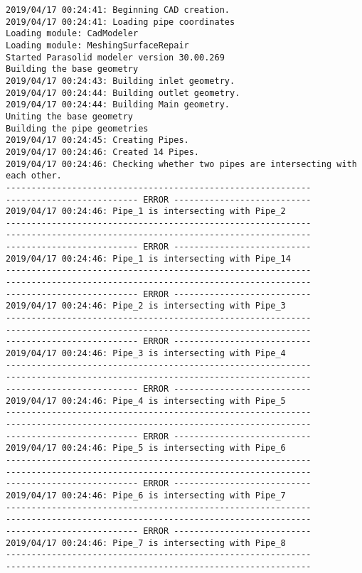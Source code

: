 \documentclass{article}
\begin{document}
{\tiny 
\begin{verbatim}
2019/04/17 00:24:41: Beginning CAD creation.
2019/04/17 00:24:41: Loading pipe coordinates
Loading module: CadModeler
Loading module: MeshingSurfaceRepair
Started Parasolid modeler version 30.00.269
Building the base geometry
2019/04/17 00:24:43: Building inlet geometry.
2019/04/17 00:24:44: Building outlet geometry.
2019/04/17 00:24:44: Building Main geometry.
Uniting the base geometry
Building the pipe geometries
2019/04/17 00:24:45: Creating Pipes.
2019/04/17 00:24:46: Created 14 Pipes.
2019/04/17 00:24:46: Checking whether two pipes are intersecting with each other.
------------------------------------------------------------
-------------------------- ERROR ---------------------------
2019/04/17 00:24:46: Pipe_1 is intersecting with Pipe_2
------------------------------------------------------------
------------------------------------------------------------
-------------------------- ERROR ---------------------------
2019/04/17 00:24:46: Pipe_1 is intersecting with Pipe_14
------------------------------------------------------------
------------------------------------------------------------
-------------------------- ERROR ---------------------------
2019/04/17 00:24:46: Pipe_2 is intersecting with Pipe_3
------------------------------------------------------------
------------------------------------------------------------
-------------------------- ERROR ---------------------------
2019/04/17 00:24:46: Pipe_3 is intersecting with Pipe_4
------------------------------------------------------------
------------------------------------------------------------
-------------------------- ERROR ---------------------------
2019/04/17 00:24:46: Pipe_4 is intersecting with Pipe_5
------------------------------------------------------------
------------------------------------------------------------
-------------------------- ERROR ---------------------------
2019/04/17 00:24:46: Pipe_5 is intersecting with Pipe_6
------------------------------------------------------------
------------------------------------------------------------
-------------------------- ERROR ---------------------------
2019/04/17 00:24:46: Pipe_6 is intersecting with Pipe_7
------------------------------------------------------------
------------------------------------------------------------
-------------------------- ERROR ---------------------------
2019/04/17 00:24:46: Pipe_7 is intersecting with Pipe_8
------------------------------------------------------------
------------------------------------------------------------

\end{verbatim}}
\end{document}
